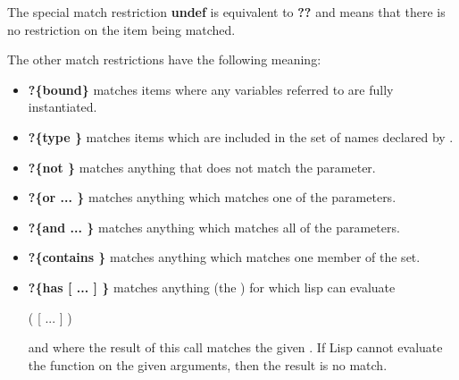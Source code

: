 The special match restriction {\bf undef} is equivalent
to {\bf ??} and means that there is no restriction on
the item being matched.


The other match restrictions have the following meaning:

\begin{itemize}

\item
{}
{\bf ?\{bound\}} matches items where any variables
referred to are fully instantiated.

\item
{}
{\bf ?\{type \}}
matches items which are included in the set of names
declared by .

\item
{}
{\bf ?\{not  \}} matches anything that
does not match the parameter.

\item
{}
{\bf ?\{or  ... \}}  matches anything which matches one
of the parameters.

\item
{}
{\bf ?\{and  ... \}} matches anything which matches
all of the parameters.

\item
{}
{\bf ?\{contains  \}} matches anything which matches
one member of the set.


\item
{}
{\bf ?\{has  [ ... ]
\}}
matches anything (the ) for which lisp can evaluate

( 
[ ... ] )

and where the result of this call matches the given
.  If Lisp cannot evaluate the function on the given
arguments, then the result is no match.


\end{itemize}
